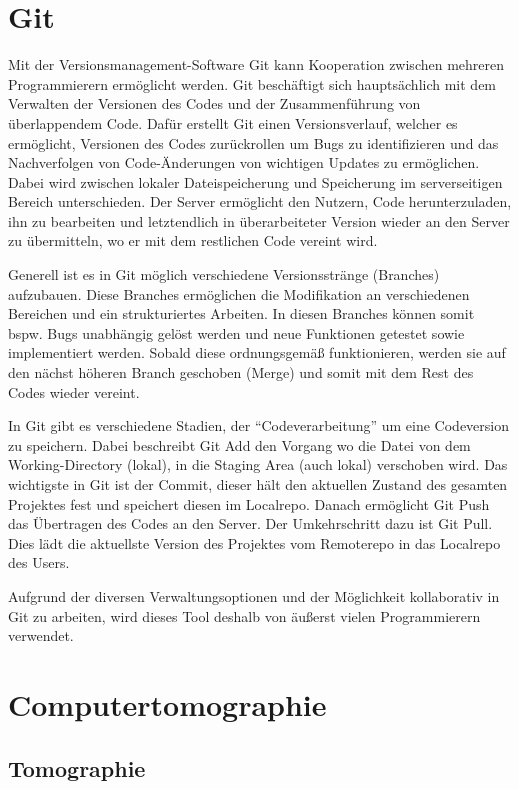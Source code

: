 \documentclass[]{dsadokumentation}
\begin{document}
\section{Git}
Mit der Versionsmanagement-Software Git kann Kooperation zwischen mehreren Programmierern ermöglicht werden. Git beschäftigt sich hauptsächlich mit dem Verwalten der Versionen des Codes und der Zusammenführung von überlappendem Code. Dafür erstellt Git einen Versionsverlauf, welcher es ermöglicht, Versionen des Codes zurückrollen um Bugs zu identifizieren und das Nachverfolgen von Code-Änderungen von wichtigen Updates zu ermöglichen. Dabei wird zwischen lokaler Dateispeicherung und Speicherung im serverseitigen Bereich unterschieden. Der Server ermöglicht den Nutzern, Code herunterzuladen, ihn zu bearbeiten und letztendlich in überarbeiteter Version wieder an den Server zu übermitteln, wo er mit dem restlichen Code vereint wird.

Generell ist es in Git möglich verschiedene Versionsstränge (Branches) aufzubauen. Diese Branches ermöglichen die Modifikation an verschiedenen Bereichen und ein strukturiertes Arbeiten. In diesen Branches können somit bspw. Bugs unabhängig gelöst werden und neue Funktionen getestet sowie implementiert werden. Sobald diese ordnungsgemäß funktionieren, werden sie auf den nächst höheren Branch geschoben (Merge) und somit mit dem Rest des Codes wieder vereint.

In Git gibt es verschiedene Stadien, der \enquote{Codeverarbeitung} um eine Codeversion zu speichern. Dabei beschreibt Git Add den Vorgang wo die Datei von dem Working-Directory (lokal), in die Staging Area (auch lokal) verschoben wird. Das wichtigste in Git ist der Commit, dieser hält den aktuellen Zustand des gesamten Projektes fest und speichert diesen im Localrepo. Danach ermöglicht Git Push das Übertragen des Codes an den Server. Der Umkehrschritt dazu ist Git Pull. Dies lädt die aktuellste Version des Projektes vom Remoterepo in das Localrepo des Users.

Aufgrund der diversen Verwaltungsoptionen und der Möglichkeit kollaborativ in Git zu arbeiten, wird dieses Tool deshalb von äußerst vielen Programmierern verwendet.

\section{Computertomographie}

\subsection{Tomographie}
\end{document}
